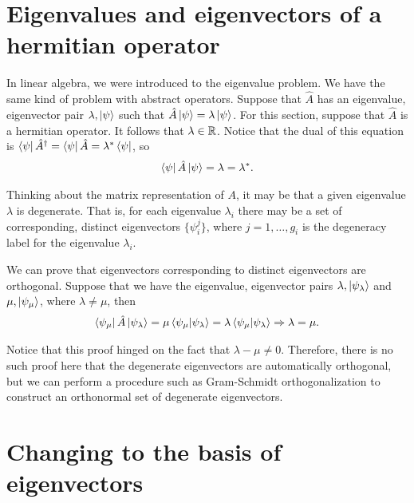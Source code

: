 \section{Eigenvalues and eigenvectors of a hermitian operator}

In linear algebra, we were introduced to the eigenvalue problem.
We have the same kind of problem with abstract operators.
Suppose that $\hat{A}$ has an eigenvalue, eigenvector pair $\lambda, \ket{\psi}$ such that $\hat{A} \ket{\psi} = \lambda \ket{\psi}$.
For this section, suppose that $\hat{A}$ is a hermitian operator.
It follows that $\lambda \in \mathbb{R}$.
Notice that the dual of this equation is $\bra{\psi} \hat{A}^{\dagger} = \bra{\psi} \hat{A} = \lambda^{*} \bra{\psi}$, so
\begin{align}
    \bra{\psi} \hat{A} \ket{\psi} = \lambda = \lambda^{*}
.\end{align}

Thinking about the matrix representation of $A$, it may be that a given eigenvalue $\lambda$ is degenerate.
That is, for each eigenvalue $\lambda_{i}$ there may be a set of corresponding, distinct eigenvectors $\{ \psi_{i}^{j} \}$, where $j = 1,\ldots,g_{i}$ is the degeneracy label for the eigenvalue $\lambda_{i}$.

We can prove that eigenvectors corresponding to distinct eigenvectors are orthogonal.
Suppose that we have the eigenvalue, eigenvector pairs $\lambda, \ket{\psi_{\lambda}}$ and $\mu, \ket{\psi_{\mu}}$, where $\lambda \ne \mu$, then
\begin{eqnarray}
    \bra{\psi_{\mu}} \hat{A} \ket{\psi_{\lambda}} = \mu \bra{\psi_{\mu}} \ket{\psi_{\lambda}} = \lambda \bra{\psi_{\mu}} \ket{\psi_{\lambda}} \Rightarrow \lambda = \mu
.\end{eqnarray}

Notice that this proof hinged on the fact that $\lambda - \mu \ne 0$.
Therefore, there is no such proof here that the degenerate eigenvectors are automatically orthogonal, but we can perform a procedure such as Gram-Schmidt orthogonalization to construct an orthonormal set of degenerate eigenvectors.


\section{Changing to the basis of eigenvectors}

